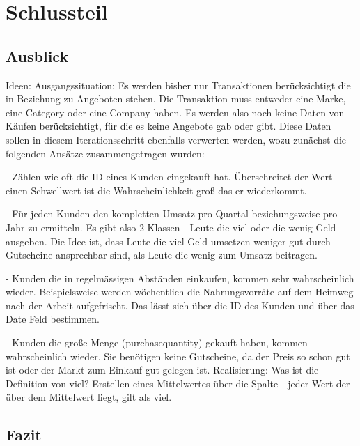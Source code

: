 \section{Schlussteil}

\subsection{Ausblick}

	Ideen:
	Ausgangssituation: Es werden bisher nur Transaktionen berücksichtigt die in Beziehung zu Angeboten stehen. Die Transaktion muss entweder eine Marke, eine Category oder eine Company haben. Es werden also noch keine Daten von Käufen berücksichtigt, für die es keine Angebote gab oder gibt. Diese Daten sollen in diesem Iterationsschritt ebenfalls verwerten werden, wozu zunächst die folgenden Ansätze zusammengetragen wurden:
	
	- Zählen wie oft die ID eines Kunden eingekauft hat. Überschreitet der Wert einen Schwellwert ist die Wahrscheinlichkeit groß das er wiederkommt.
	
	- Für jeden Kunden den kompletten Umsatz pro Quartal beziehungsweise pro Jahr zu ermitteln. Es gibt also 2 Klassen - Leute die viel oder die wenig Geld ausgeben. Die Idee ist, dass Leute die viel Geld umsetzen weniger gut durch Gutscheine ansprechbar sind, als Leute die wenig zum Umsatz beitragen.  
	
	- Kunden die in regelmässigen Abständen einkaufen, kommen sehr wahrscheinlich wieder. Beispielsweise werden wöchentlich die Nahrungsvorräte auf dem Heimweg nach der Arbeit aufgefrischt. Das lässt sich über die ID des Kunden und über das Date Feld bestimmen.
	
	- Kunden die große Menge (purchasequantity) gekauft haben, kommen wahrscheinlich wieder. Sie benötigen keine Gutscheine, da der Preis so schon gut ist oder der Markt zum Einkauf gut gelegen ist. Realisierung: Was ist die Definition von viel? Erstellen eines Mittelwertes über die Spalte - jeder Wert der über dem Mittelwert liegt, gilt als viel.
	

\subsection{Fazit}
